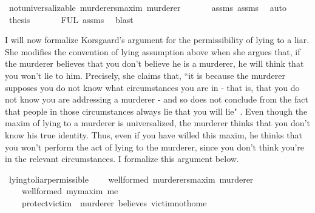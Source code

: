 \begin{isabellebody}
\ {\isachardoublequoteopen}not{\isacharunderscore}universalizable\ murderers{\isacharunderscore}maxim\ murderer{\isachardoublequoteclose}\isanewline
\ \ \ \ \ \isamarkupfalse%
\ assms{\isacharparenleft}{}{\isacharparenright}\ assms{\isacharparenleft}{}{\isacharparenright}\ \isamarkupfalse%
\ auto\isanewline
\ \ \ \isamarkupfalse%
\ {\isacharquery}thesis\isanewline
\ \ \ \ \ \isamarkupfalse%
\ FUL\ assms{\isacharparenleft}{}{\isacharparenright}\ \isamarkupfalse%
\ blast\isanewline
\ \isamarkupfalse%
%
\endisatagproof
{\isafoldproof}%
%
\isadelimproof
%
\endisadelimproof
%
\begin{isamarkuptext}%
I will now formalize Korsgaard's argument for the permissibility of lying to a liar. She modifies
the convention of lying assumption above when she argues that, if the murderer believes that you don't 
believe he is a murderer, he will think that you won't lie to him. Precisely, she claims that, 
``it is because the murderer supposes you do not know what circumstances you are in - that is, that 
you do not know you are addressing a murderer - and so does not conclude from the fact that people 
in those circumstances always lie that you will lie" \cite[6]{KorsgaardRTL}. Even though the maxim of 
lying to a murderer is universalized, the murderer thinks that you don't know his true identity. Thus,
even if you have willed this maxim, he thinks that you won't perform the act of lying to the murderer,
since you don't think you're in the relevant circumstances. I formalize this argument below.%
\end{isamarkuptext}\isamarkuptrue%
\isamarkupfalse%
\ lying{\isacharunderscore}to{\isacharunderscore}liar{\isacharunderscore}permissible{\isacharcolon}\isanewline
\ \ \ {\isachardoublequoteopen}{\isasymTurnstile}\ {\isacharparenleft}well{\isacharunderscore}formed\ murderers{\isacharunderscore}maxim\ murderer{\isacharparenright}{\isachardoublequoteclose}\isanewline
\ \ \ {\isachardoublequoteopen}{\isasymTurnstile}\ {\isacharparenleft}well{\isacharunderscore}formed\ my{\isacharunderscore}maxim\ me{\isacharparenright}{\isachardoublequoteclose}\isanewline
%
\isanewline
\ \ \ {\isachardoublequoteopen}{\isasymTurnstile}\ {\isacharparenleft}protect{\isacharunderscore}victim\ \isactrlbold {\isasymrightarrow}\ {\isacharparenleft}murderer\ believes\ victim{\isacharunderscore}not{\isacharunderscore}home{\isacharparenright}{\isacharparenright}{\isachardoublequoteclose}\isanewline

\end{isabellebody}
